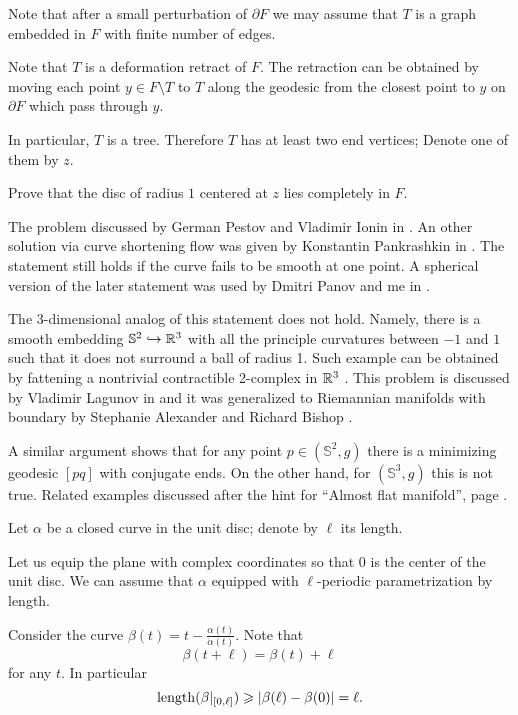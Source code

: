 Note that after a small perturbation
of $\partial F$ we may assume that
$T$ is a graph embedded in
$F$ with finite number of edges.

Note that $T$ is a
deformation retract of $F$.
The retraction can be obtained by moving each point $y\in F\setminus T$ to $T$
along the geodesic from the closest point to $y$ on $\partial F$ which pass through $y$.

In particular, $T$ is a tree.
Therefore $T$  has
at least two end vertices;
Denote one of them by $z$.

Prove that the disc of radius $1$ centered at $z$ lies completely in $F$.\qeds

The problem discussed by German Pestov and Vla\-di\-mir Ionin in \cite{pestov-ionin}.
An other solution via curve shortening flow 
was given by Konstantin Pankrashkin in  \cite{pankrashkin}.
The statement still holds if the curve fails to be smooth at one point.
A spherical version of the later statement 
was used by Dmitri Panov and me 
in \cite{panov-petrunin-ramification}.

The 3-dimensional analog of this statement does not hold.
Namely, there is a smooth embedding $\mathbb{S}^2\hookrightarrow \mathbb{R}^3$ 
with all the principle curvatures between $-1$ and $1$
such that it does not surround a ball of radius 1.
Such example can be obtained by fattening a nontrivial contractible 2-complex in $\mathbb{R}^3$ 
\cite[the Bing's house constructed in][will do the job]{bing}.
This problem is discussed by Vladimir Lagunov in \cite{lagunov-2} 
and it was generalized to Riemannian manifolds with boundary by Stephanie Alexander and Richard Bishop \cite[see][]{alexander-bishop}.

A similar argument shows that
for any point $p\in (\mathbb S^2,g)$ there is a minimizing geodesic $[pq]$ with conjugate ends.
On the other hand, 
for $(\mathbb S^3,g)$ this is not true.
Related examples discussed after the hint for ``Almost flat manifold'', page \pageref{page-sol:almost-flat}.



 


Let $\alpha$ be a closed curve in the unit disc;
denote by $\ell$ its length.

Let us equip the plane with complex coordinates so that $0$ is the center of the unit disc.
We can assume that $\alpha$ equipped with $\ell$-periodic parametrization by length.

Consider the curve $\beta(t)=t-\tfrac{\alpha(t)}{\dot\alpha(t)}$.
Note that 
\[\beta(t+\ell)=\beta(t)+\ell\] 
for any $t$.
In particular 
\[\operatorname{\rm length} (\beta|_{[0,\ell]}) 
\geqslant 
|\beta(\ell)-\beta(0)|
=
\ell.\]

